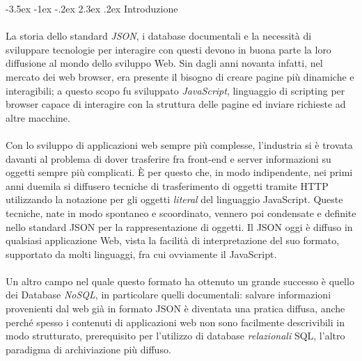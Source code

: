 \documentclass[a4paper, 12pt]{report}
\begin{document}

\graphicspath{ {./} }
\setlength{\parindent}{0em}
\setcounter{secnumdepth}{0}
\makeatletter
\renewcommand\section{\@startsection{section}{1}{\z@}%
                                   {-3.5ex \@plus -1ex \@minus -.2ex}%
                                   {2.3ex \@plus.2ex}%
                                   {\normalfont\large\bfseries\center}}
  \section{Introduzione}
    \paragraph*{}
      La storia dello standard \emph{JSON}, i database documentali e la necessità di sviluppare tecnologie per interagire con questi devono in buona parte la loro diffusione al mondo dello sviluppo Web.
      Sin dagli anni novanta infatti, nel mercato dei web browser, era presente il bisogno di creare pagine più dinamiche e interagibili; a questo scopo fu sviluppato \emph{JavaScript}, linguaggio di scripting per browser capace di interagire con la struttura delle pagine ed inviare richieste ad altre macchine.
    \paragraph*{}
      Con lo sviluppo di applicazioni web sempre più complesse, l'industria si è trovata davanti al problema di dover trasferire fra front-end e server informazioni su oggetti sempre più complicati.
      È per questo che, in modo indipendente, nei primi anni duemila si diffusero tecniche di trasferimento di oggetti tramite HTTP utilizzando la notazione per gli oggetti \emph{literal} del linguaggio JavaScript.
      Queste tecniche, nate in modo spontaneo e scoordinato, vennero poi condensate e definite nello standard JSON per la rappresentazione di oggetti.
      Il JSON oggi è diffuso in qualsiasi applicazione Web, vista la facilità di interpretazione del suo formato, supportato da molti linguaggi, fra cui ovviamente il JavaScript.
      \paragraph*{}
      Un altro campo nel quale questo formato ha ottenuto un grande successo è quello dei Database \emph{NoSQL}, in particolare quelli documentali: salvare informazioni provenienti dal web già in formato JSON è diventata una pratica diffusa, anche perché spesso i contenuti di applicazioni web non sono facilmente descrivibili in modo strutturato, prerequisito per l'utilizzo di database \emph{relazionali} SQL, l'altro paradigma di archiviazione più diffuso.
\end{document}
